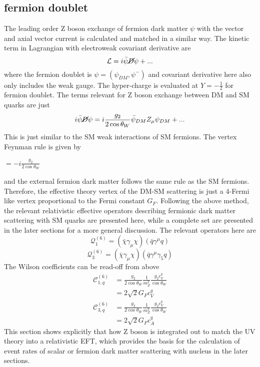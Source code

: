 \documentclass[12pt]{article}
\begin{document}
\subsection{fermion doublet}
The leading order Z boson exchange of fermion dark matter $\psi$ with the vector and axial vector current is calculated and matched in a similar way. The kinetic term in Lagrangian with electroweak covariant derivative are
$$
\mathcal L = i \bar \psi \cancel D \psi + ...
$$
where the fermion doublet is $\psi = ( \psi_{DM} , \psi^-)$ and covariant derivative here also only includes the weak gauge.  The hyper-charge is evaluated at $Y=-\frac{1}{2} $ for fermion doublet. The terms relevant for Z boson exchange between DM and SM quarks are just 
$$
i  \bar \psi \cancel D \psi  = i \frac{g_2}{2\cos \theta_W}  \bar \psi_{DM} Z_\mu \psi_{DM} + ...
$$
This is just similar to the SM weak interactions of SM fermions. The vertex Feynman rule is given by
\begin{center}
$= - i\frac{ g_2 }{2 \cos \theta_W}  $
\end{center}
and the external fermion dark matter follows the same rule as the SM fermions. 
Therefore, the effective theory vertex of the DM-SM scattering is just a 4-Fermi like vertex proportional to the Fermi constant $G_F$. Following the above method, the relevant relativistic effective operators describing fermionic dark matter scattering with SM quarks are presented here, while a complete set are presented in the later sections for a more general discussion. The relevant operators here are
$$
  \mathcal Q_1^{(6)} = (\bar \chi \gamma_\mu \chi ) (\bar q \gamma^\mu q)
$$
$$
  \mathcal Q_3^{(6)} = (\bar \chi \gamma_\mu \chi ) (\bar q \gamma^\mu \gamma_5 q)
$$
The Wilson coefficients can be read-off from above
\begin{equation}
\begin{aligned}
\mathcal C_{1,q}^{(6)}
&
= \frac{g_2}{2 \cos \theta_W } \frac{1}{m_Z^2} \frac{g_2 c_V^q}{\cos \theta_W}\\
& = 2\sqrt 2 G_F c_V^q
\end{aligned}
\end{equation}
\begin{equation}
\begin{aligned}
\mathcal C_{3,q}^{(6)}
&
= \frac{g_2}{2 \cos \theta_W } \frac{1}{m_Z^2} \frac{g_2 c_V^q}{\cos \theta_W}\\
& = 2\sqrt 2 G_F c_A^q
\end{aligned}
\end{equation}
This section shows explicitly that how Z boson is integrated out to match the UV theory into a relativistic EFT, which provides the basis for the calculation of event rates of scalar or fermion dark matter scattering with nucleus in the later sections. 
\end{document}
